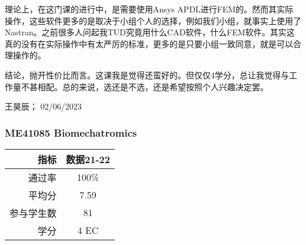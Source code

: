 理论上，在这门课的进行中，是需要使用Ansys APDL进行FEM的。然而其实际操作，这些软件更多的是取决于小组个人的选择，例如我们小组，就事实上使用了Nastran。之前很多人问起我TUD究竟用什么CAD软件，什么FEM软件。其实这真的没有在实际操作中有太严厉的标准，更多的是只要小组一致同意，就是可以合理操作的。

结论，抛开性价比而言。这课我是觉得还蛮好的。但仅仅4学分，总让我觉得与工作量不甚相配。总的来说，选还是不选，还是希望按照个人兴趣决定罢。
\begin{flushright}
王昊辰； 02/06/2023
\end{flushright}

\subsubsection{ME41085 Biomechatromics}
\begin{minipage}{0.45\textwidth}
\centering
{}
\end{minipage}%
\begin{minipage}{0.45\textwidth}
\raggedleft
\begin{tabular}{r|c}
\textbf{指标} & \textbf{数据21-22} \\ \hline
通过率 & 100\% \\ 
平均分 & 7.59 \\ 
参与学生数 & 81 \\
学分 & 4 EC\\
\end{tabular}
\end{minipage}\\
